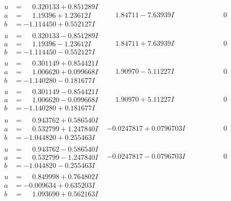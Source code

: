 \documentclass[1p]{elsarticle_modified}
\theoremstyle{definition}
\begin{document}
$$\begin{array}{c|c|c}
\begin{aligned}
u &= \phantom{-}0.320133 + 0.851289 I \\
a &= \phantom{-}1.19396 + 1.23612 I \\
b &= -1.114450 + 0.552127 I\end{aligned}
 & \phantom{-}1.84711 - 7.63939 I & \phantom{-0.000000 } 0 \\ \hline\begin{aligned}
u &= \phantom{-}0.320133 - 0.851289 I \\
a &= \phantom{-}1.19396 - 1.23612 I \\
b &= -1.114450 - 0.552127 I\end{aligned}
 & \phantom{-}1.84711 + 7.63939 I & \phantom{-0.000000 } 0 \\ \hline\begin{aligned}
u &= \phantom{-}0.301149 + 0.854421 I \\
a &= \phantom{-}1.006620 + 0.099668 I \\
b &= -1.140280 - 0.181677 I\end{aligned}
 & \phantom{-}1.90970 - 5.11227 I & \phantom{-0.000000 } 0 \\ \hline\begin{aligned}
u &= \phantom{-}0.301149 - 0.854421 I \\
a &= \phantom{-}1.006620 - 0.099668 I \\
b &= -1.140280 + 0.181677 I\end{aligned}
 & \phantom{-}1.90970 + 5.11227 I & \phantom{-0.000000 } 0 \\ \hline\begin{aligned}
u &= \phantom{-}0.943762 + 0.586540 I \\
a &= \phantom{-}0.532799 + 1.247840 I \\
b &= -1.044820 + 0.255463 I\end{aligned}
 & -0.0247817 + 0.0796703 I & \phantom{-0.000000 } 0 \\ \hline\begin{aligned}
u &= \phantom{-}0.943762 - 0.586540 I \\
a &= \phantom{-}0.532799 - 1.247840 I \\
b &= -1.044820 - 0.255463 I\end{aligned}
 & -0.0247817 - 0.0796703 I & \phantom{-0.000000 } 0 \\ \hline\begin{aligned}
u &= \phantom{-}0.849998 + 0.764802 I \\
a &= -0.009634 + 0.635203 I \\
b &= \phantom{-}1.093690 + 0.562163 I\end{aligned}

\end{array}$$
\end{document}
